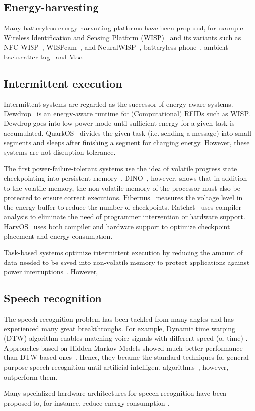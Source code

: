 \subsection{Energy-harvesting}
Many batteryless energy-harvesting platforms have been proposed, for example Wireless Identification and Sensing Platform (WISP)~\cite{smith_ubicomp_2006} and its variants such as NFC-WISP~\cite{zhao2015nfc}, WISPcam~\cite{naderiparizi_rfid_2015}, and NeuralWISP~\cite{yeager2009neuralwisp}, batteryless phone~\cite{talla2017battery}, ambient backscatter tag~\cite{liu2013ambient} and Moo~\cite{moo}.

\subsection{Intermittent execution}
Intermittent systems are regarded as the successor of energy-aware systems. Dewdrop~\cite{buettner2011dewdrop} is an energy-aware runtime for (Computational) RFIDs such as WISP. 
Dewdrop goes into low-power mode until sufficient energy for a given task is accumulated. QuarkOS~\cite{zhang2013quarkos} divides the given task (i.e. sending a message) into small segments and sleeps after finishing a segment for charging energy. However, these systems are not disruption tolerance.  

The first power-failure-tolerant systems use the idea of volatile progress state checkpointing into persistent memory~\cite{mementos}. DINO~\cite{dino}, however, shows that in addition to the volatile memory, the non-volatile memory of the processor must also be protected to ensure correct executions. Hibernus~\cite{balsamo2015hibernus} measures the voltage level in the energy buffer to reduce the number of checkpoints. Ratchet~\cite{woude2016ratchet} uses compiler analysis to eliminate the need of programmer intervention or hardware support. HarvOS~\cite{bhatti2017harvos} uses both compiler and hardware support to optimize checkpoint placement and energy consumption.

Task-based systems optimize intermittent execution by reducing the amount of data needed to be saved into non-volatile memory to protect applications against power interruptions~\cite{colin2016chain}. However,  



\subsection{Speech recognition}
The speech recognition problem has been tackled from many angles and has experienced many great breakthroughs. For example, Dynamic time warping (DTW) algorithm enables matching voice signals with different speed (or time) \cite{}. Approaches based on Hidden Markov Models showed much better performance than DTW-based ones~\cite{jelinek1997statistical}. Hence, they became the standard techniques for general purpose speech recognition until artificial intelligent algorithms~\cite{hinton2012deep}, however, outperform them. 

Many specialized hardware architectures for speech recognition have been proposed to, for instance, reduce energy consumption \cite{price2018low,price20156}. 

